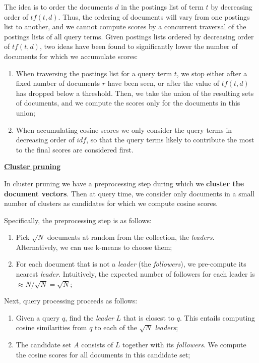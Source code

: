 The idea is to order the documents $d$ in the postings list of term $t$ by decreasing order of $tf(t,d)$. Thus, the ordering of documents will vary from one postings list to another, and we cannot compute scores by a concurrent traversal of the postings lists of all query terms. Given postings lists ordered by decreasing order of $tf(t,d)$, two ideas have been found to significantly lower the number of documents for which we accumulate scores: 

\begin{enumerate}
    \item When traversing the postings list for a query term $t$, we stop either after a fixed number of documents $r$ have been seen, or after the value of $tf(t,d)$ has dropped below a threshold. Then, we take the union of the resulting sets of documents, and we compute the scores only for the documents in this union;
    \item When accumulating cosine scores we only consider the query terms in decreasing order of $idf$, so that the query terms likely to contribute the most to the final scores are considered first.
\end{enumerate}

\underline{\textbf{\textbf{Cluster pruning}}}

In cluster pruning we have a preprocessing step during which we \textbf{cluster the document vectors}. Then at query time, we consider only documents in a small number of clusters as candidates for which we compute cosine scores. 

Specifically, the preprocessing step is as follows:

\begin{enumerate}
    \item Pick $\sqrt{N}$ documents at random from the collection, the \textit{leaders}. Alternatively, we can use k-means to choose them;
    \item For each document that is not a \textit{leader} (the \textit{followers}), we pre-compute its nearest \textit{leader}. Intuitively, the expected number of followers for each leader is $\approx N / \sqrt{N} = \sqrt{N}$;
\end{enumerate}

Next, query processing proceeds as follows:

\begin{enumerate}
    \item Given a query $q$, find the \textit{leader} $L$ that is closest to $q$. This entails computing cosine similarities from $q$ to each of the $\sqrt{N}$ \textit{leaders};
    \item The candidate set $A$ consists of $L$ together with its \textit{followers}. We compute the cosine scores for all documents in this candidate set;
\end{enumerate}

